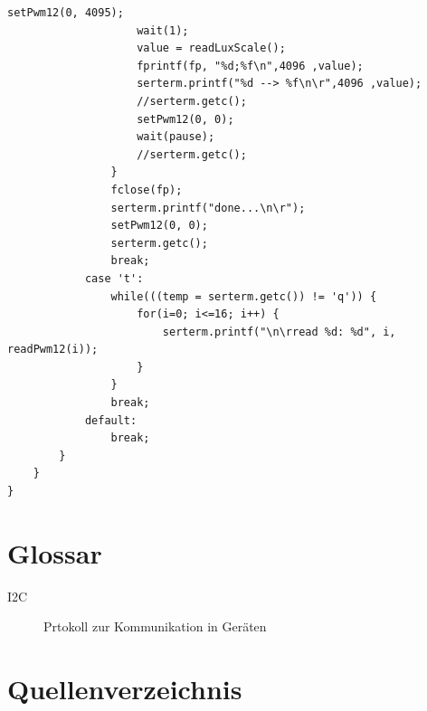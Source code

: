 \documentclass[a4paper,12pt]{scrartcl}
\begin{document}
\begin{lstlisting}[captionpos=b, caption=MBED-Programmcode für den Messaufbau, label=messprogkomplett]
                    setPwm12(0, 4095);
                    wait(1);
                    value = readLuxScale();
                    fprintf(fp, "%d;%f\n",4096 ,value);
                    serterm.printf("%d --> %f\n\r",4096 ,value);
                    //serterm.getc();
                    setPwm12(0, 0);
                    wait(pause);
                    //serterm.getc();
                }
                fclose(fp);
                serterm.printf("done...\n\r");
                setPwm12(0, 0);
                serterm.getc();
                break;
            case 't':
                while(((temp = serterm.getc()) != 'q')) {
                    for(i=0; i<=16; i++) {
                        serterm.printf("\n\rread %d: %d", i, readPwm12(i));
                    }
                }
                break;
            default:
                break;
        }
    }
}
\end{lstlisting}


\clearpage
\section{Glossar}
\begin{description}
 \item[I2C] Prtokoll zur Kommunikation in Geräten
\end{description}

\clearpage
\section{Quellenverzeichnis}
\end{document}
